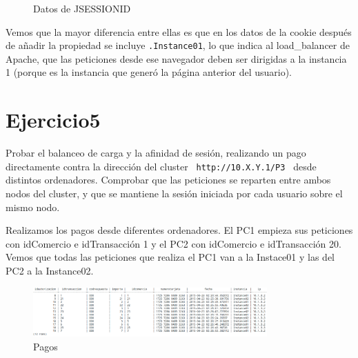 \documentclass[a4paper, 10pt]{article}
\begin{document}
\begin{figure}[htbp]
	\centering
	\caption{Datos de JSESSIONID}
\end{figure}

Vemos que la mayor diferencia entre ellas es que en los datos de la cookie después de añadir la propiedad se incluye \texttt{.Instance01}, lo que indica al load\_balancer de Apache, que las peticiones desde ese navegador deben ser dirigidas a la instancia 1 (porque es la instancia que generó la página anterior del usuario).
\newpage
\section{Ejercicio5}
\begin{mdframed}
	 Probar el balanceo de carga y la afinidad de sesión, realizando un pago directamente contra la dirección del cluster
	 \texttt{ http://10.X.Y.1/P3 }
	 desde distintos ordenadores. Comprobar que las peticiones se reparten entre ambos nodos del cluster, y
	 que se mantiene la sesión iniciada por cada usuario sobre el mismo nodo. 
\end{mdframed}

Realizamos los pagos desde diferentes ordenadores. El PC1 empieza sus peticiones con idComercio e idTransacción 1 y el PC2 con idComercio e idTransacción 20. 
Vemos que todas las peticiones que realiza el PC1 van a la Instace01 y las del PC2 a la Instance02.

\begin{figure}[hbtp]
	\centering
	\includegraphics[width=0.8\textwidth]{../../P3/pantallazos/ej5.png}
	\caption { Pagos }
\end{figure}
\end{document}
